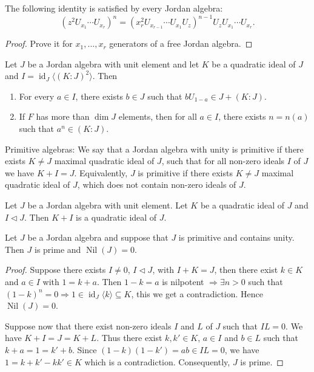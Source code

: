 \documentclass{article}
\begin{document}
\begin{lemma}
The following identity is satisfied by every Jordan algebra:
\[
\left(z^2U_{x_1}\cdots U_{x_r}\right)^n=\left(x_r^2U_{x_{r-1}}\cdots U_{x_1}U_z\right)^{n-1}U_zU_{x_1}\cdots U_{x_r}.
\]
\end{lemma}

\begin{proof}
Prove it for $x_1,\dots,x_r$ generators of a free Jordan algebra.
\end{proof}

\begin{theorem}
Let $J$ be a Jordan algebra with unit element and let $K$ be a quadratic ideal of $J$ and $I=\operatorname{id}_J\langle (K:J)^2\rangle$. Then
\begin{enumerate}
\item[(i)] For every $a\in I$, there exists $b\in J$ such that $bU_{1-a}\in J+(K:J)$.
\item[(ii)] If $F$ has more than $\dim J$ elements, then for all $a\in I$, there exists $n=n(a)$ such that $a^n\in(K:J)$.
\end{enumerate}
\end{theorem}

Primitive algebras: We say that a Jordan algebra with unity is primitive if there exists $K\neq J$ maximal quadratic ideal of $J$, such that for all non-zero ideals $I$ of $J$ we have $K+I=J$. Equivalently, $J$ is primitive if there exists $K\neq J$ maximal quadratic ideal of $J$, which does not contain non-zero ideals of $J$.

\begin{lemma}
Let $J$ be a Jordan algebra with unit element. Let $K$ be a quadratic ideal of $J$ and $I\triangleleft J$. Then $K+I$ is a quadratic ideal of $J$.
\end{lemma}

\begin{lemma}
Let $J$ be a Jordan algebra and suppose that $J$ is primitive and contains unity. Then $J$ is prime and $\operatorname{Nil}(J)=0$.
\end{lemma}

\begin{proof}
Suppose there exists $I\neq0$, $I\triangleleft J$, with $I+K=J$, then there exist $k\in K$ and $a\in I$ with $1=k+a$. Then $1-k=a$ is nilpotent $\Rightarrow\exists n>0$ such that $(1-k)^n=0\Rightarrow1\in\operatorname{id}_J\langle k\rangle\subseteq K$, this we get a contradiction. Hence $\operatorname{Nil}(J)=0$.

Suppose now that there exist non-zero ideals $I$ and $L$ of $J$ such that $IL=0$. We have $K+I=J=K+L$. Thus there exist $k,k'\in K$, $a\in I$ and $b\in L$ such that $k+a=1=k'+b$. Since $(1-k)(1-k')=ab\in IL=0$, we have $1=k+k'-kk'\in K$ which is a contradiction. Consequently, $J$ is prime.
\end{proof}
\end{document}
